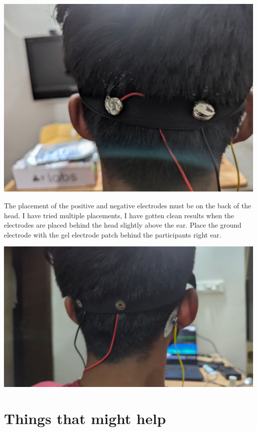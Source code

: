 \documentclass[
  letterpaper,
  DIV=11,
  numbers=noendperiod]{scrreprt}
\begin{document}
\includegraphics{images/clipboard-2783055425.png}

The placement of the positive and negative electrodes must be on the
back of the head. I have tried multiple placements, I have gotten clean
results when the electrodes are placed behind the head slightly above
the ear. Place the ground electrode with the gel electrode patch behind
the participants right ear.

\includegraphics{images/clipboard-1512373558.png}

\section{Things that might help}\label{things-that-might-help}
\end{document}
